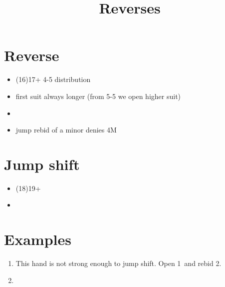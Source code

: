 \documentclass[12pt, a4paper]{article}
\title{Reverses}
\date{}
\begin{document}
\maketitle

\section{Reverse}
\begin{itemize}
    \item (16)17+ 4-5 distribution
    \item first suit always longer (from 5-5 we open higher suit)
    \item \fonce
    \item jump rebid of a minor denies 4M \vimp
\end{itemize}

\section{Jump shift}
\begin{itemize}
    \item (18)19+
    \item \gf
\end{itemize}

\section{Examples}

\begin{enumerate}
    \item {}
    This hand is not strong enough to jump shift. Open 1\diams\ and rebid 2\clubs.
    \item 
\end{enumerate}
\end{document}
